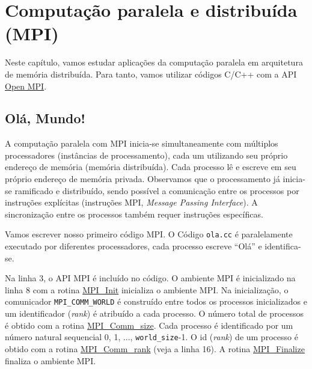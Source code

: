 
\chapter{Computação paralela e distribuída (MPI)}\label{cap_mpi}
\thispagestyle{fancy}

Neste capítulo, vamos estudar aplicações da computação paralela em arquitetura de memória distribuída. Para tanto, vamos utilizar códigos C/C++ com a API \href{https://www.open-mpi.org/}{Open MPI}.

\section{Olá, Mundo!}\label{cap_mpi_sec_ola}

A computação paralela com MPI inicia-se simultaneamente com múltiplos processadores (instâncias de processamento), cada um utilizando seu próprio endereço de memória (memória distribuída). Cada processo lê e escreve em seu próprio endereço de memória privada. Observamos que o processamento já inicia-se ramificado e distribuído, sendo possível a comunicação entre os processos por instruções explícitas (instruções MPI, {\it Message Passing Interface}). A sincronização entre os processos também requer instruções específicas.

Vamos escrever nosso primeiro código MPI. O Código \verb+ola.cc+ é paralelamente executado por diferentes processadores, cada processo escreve ``Olá'' e identifica-se.



Na linha 3, o API MPI é incluído no código. O ambiente MPI é inicializado na linha 8 com a rotina \href{https://www.open-mpi.org/doc/v4.1/man3/MPI\_Init.3.php}{MPI\_Init} inicializa o ambiente MPI. Na inicialização, o comunicador \verb+MPI_COMM_WORLD+ é construído entre todos os processos inicializados e um identificador ({\it rank}) é atribuído a cada processo. O número total de processos é obtido com a rotina \href{https://www.open-mpi.org/doc/v4.1/man3/MPI\_Comm\_size.3.php}{MPI\_Comm\_size}. Cada processo é identificado por um número natural sequencial 0, 1, ..., \verb+world_size+-1. O id ({\it rank}) de um processo é obtido com a rotina \href{https://www.open-mpi.org/doc/v4.1/man3/MPI\_Comm\_rank.3.php}{MPI\_Comm\_rank} (veja a linha 16). A rotina \href{https://www.open-mpi.org/doc/v4.1/man3/MPI\_Finalize.3.php}{MPI\_Finalize} finaliza o ambiente MPI.


